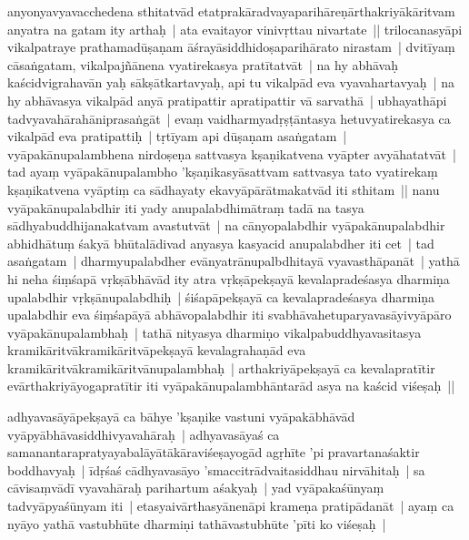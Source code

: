 \documentclass[article,12pt,a4paper]{memoir}%
\newcommand{\persName}[1]{#1}
\newcounter{parCount}
\begin{document}
anyonyavyavacchedena sthitatvād etatprakāradvayaparihāreṇārthakriyākāritvam anyatra na gatam ity arthaḥ | ata evaitayor vinivṛttau nivartate || \label{thakur75-91.17} \persName{trilocanasyā}pi vikalpatraye prathamadūṣaṇam āśrayāsiddhidoṣaparihārato nirastam | \label{thakur75-91.18} dvitīyaṃ cāsaṅgatam, vikalpajñānena vyatirekasya pratītatvāt | na hy abhāvaḥ kaścidvigrahavān yaḥ sākṣātkartavyaḥ, api tu vikalpād eva vyavahartavyaḥ | na hy abhāvasya vikalpād anyā pratipattir apratipattir vā sarvathā | ubhayathāpi tadvyavahārahāniprasaṅgāt | evaṃ vaidharmyadṛṣṭāntasya hetuvyatirekasya ca vikalpād eva pratipattiḥ | \label{thakur75-91.22} tṛtīyam api dūṣaṇam asaṅgatam | vyāpakānupalambhena nirdoṣeṇa sattvasya kṣaṇikatvena vyāpter avyāhatatvāt | \label{thakur75-91.23} tad ayaṃ vyāpakānupalambho 'kṣaṇikasyāsattvam sattvasya tato vyatirekaṃ kṣaṇikatvena vyāptiṃ ca sādhayaty ekavyāpārātmakatvād iti sthitam || \label{thakur75-91.25} nanu vyāpakānupalabdhir iti yady anupalabdhimātraṃ tadā na tasya sādhyabuddhijanakatvam avastutvāt | na cānyopalabdhir vyāpakānupalabdhir abhidhātuṃ śakyā bhūtalādivad anyasya kasyacid anupalabdher iti cet | \label{thakur75-91.27} tad asaṅgatam | dharmyupalabdher evānyatrānupalbdhitayā vyavasthāpanāt | yathā hi neha śiṃśapā vṛkṣābhāvād ity atra vṛkṣāpekṣayā kevalapradeśasya dharmiṇa upalabdhir vṛkṣānupalabdhiḥ | śiśapāpekṣayā ca kevalapradeśasya dharmiṇa upalabdhir eva śiṃśapāyā abhāvopalabdhir iti svabhāvahetuparyavasāyivyāpāro vyāpakānupalambhaḥ | tathā nityasya dharmiṇo vikalpabuddhyavasitasya kramikāritvākramikāritvāpekṣayā kevalagrahaṇād eva kramikāritvākramikāritvānupalambhaḥ | arthakriyāpekṣayā ca kevalapratītir evārthakriyāyogapratītir iti vyāpakānupalambhāntarād asya na kaścid viśeṣaḥ ||
	{}
	\pend%
      

	  \pstart \leavevmode%
	\label{thakur75-92.5}adhyavasāyāpekṣayā ca bāhye 'kṣaṇike vastuni vyāpakābhāvād vyāpyābhāvasiddhivyavahāraḥ | adhyavasāyaś ca samanantarapratyayabalāyātākāraviśeṣayogād agṛhīte 'pi pravartanaśaktir boddhavyaḥ | īdṛśaś cādhyavasāyo 'smaccitrādvaitasiddhau nirvāhitaḥ | sa cāvisaṃvādī vyavahāraḥ parihartum aśakyaḥ | yad vyāpakaśūnyaṃ tadvyāpyaśūnyam iti | etasyaivārthasyānenāpi krameṇa pratipādanāt | ayaṃ ca nyāyo yathā vastubhūte dharmiṇi tathāvastubhūte 'pīti ko viśeṣaḥ | 
	{}
	\pend%
      
\end{document}
